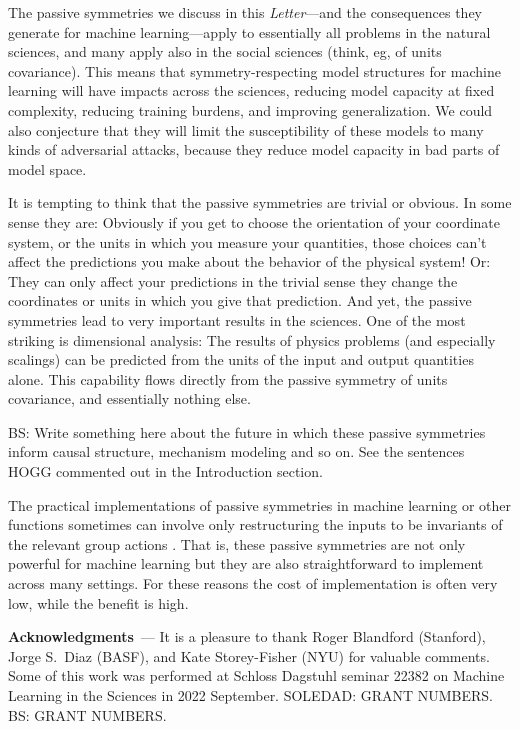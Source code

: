 \documentclass[11pt]{article}
\renewcommand{\paragraph}[1]{\medskip\par\noindent\textbf{#1}~---}
\newcommand{\documentname}{\textsl{Letter}}
\begin{document}
The passive symmetries we discuss in this \documentname{}---and the consequences they generate for machine learning---apply to essentially all problems in the natural sciences, and many apply also in the social sciences (think, eg, of units covariance).
This means that symmetry-respecting model structures for machine learning will have impacts across the sciences, reducing model capacity at fixed complexity, reducing training burdens, and improving generalization.
We could also conjecture that they will limit the susceptibility of these models to many kinds of adversarial attacks, because they reduce model capacity in bad parts of model space.

It is tempting to think that the passive symmetries are trivial or obvious.
In some sense they are: Obviously if you get to choose the orientation of your coordinate system, or the units in which you measure your quantities, those choices can't affect the predictions you make about the behavior of the physical system!
Or: They can only affect your predictions in the trivial sense they change the coordinates or units in which you give that prediction.
And yet, the passive symmetries lead to very important results in the sciences.
One of the most striking is dimensional analysis: The results of physics problems (and especially scalings) can be predicted from the units of the input and output quantities alone.
This capability flows directly from the passive symmetry of units covariance, and essentially nothing else.

BS: Write something here about the future in which these passive symmetries inform causal structure, mechanism modeling and so on. See the sentences HOGG commented out in the Introduction section.

The practical implementations of passive symmetries in machine learning or other functions sometimes can involve only restructuring the inputs to be invariants of the relevant group actions \cite{villar2021scalars, blum2022equivariant}.
That is, these passive symmetries are not only powerful for machine learning but they are also straightforward to implement across many settings.
For these reasons the cost of implementation is often very low, while the benefit is high.

\paragraph{Acknowledgments}
It is a pleasure to thank Roger Blandford (Stanford), Jorge S.~Diaz (BASF), and Kate Storey-Fisher (NYU) for valuable comments.
Some of this work was performed at Schloss Dagstuhl seminar 22382 on Machine Learning in the Sciences in 2022 September.
SOLEDAD: GRANT NUMBERS.
BS: GRANT NUMBERS.


\raggedright

\end{document}
